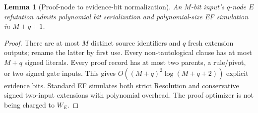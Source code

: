 \documentclass[11pt]{article}
\newtheorem{lemma}[theorem]{Lemma}
\begin{document}
\begin{lemma}[Proof-node to evidence-bit normalization]
An $M$-bit input's $q$-node $E$ refutation admits polynomial bit serialization and polynomial-size EF simulation in $M+q+1$.
\end{lemma}
\begin{proof}
There are at most $M$ distinct source identifiers and $q$ fresh extension outputs; rename the latter by first use. Every non-tautological clause has at most $M+q$ signed literals. Every proof record has at most two parents, a rule/pivot, or two signed gate inputs. This gives $O((M+q)^2\log(M+q+2))$ explicit evidence bits. Standard EF simulates both strict Resolution and conservative signed two-input extensions with polynomial overhead. The proof optimizer is not being charged to $W_E$.
\end{proof}
\end{document}
